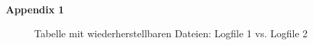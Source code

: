 \begin{appendices}
		
		\huge{\textbf{Appendix 1}}
		\begin{figure}[h!]
			\centerline{}
			\caption{Tabelle mit wiederherstellbaren Dateien: Logfile 1 vs. Logfile 2}
		\end{figure}
		

\end{appendices}
